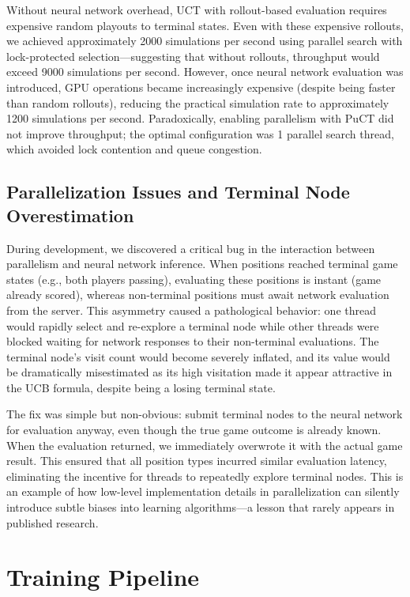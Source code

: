 \documentclass[12pt]{article}
\begin{document}
Without neural network overhead, UCT with rollout-based evaluation requires expensive random playouts to terminal states. Even with these expensive rollouts, we achieved approximately 2000 simulations per second using parallel search with lock-protected selection—suggesting that without rollouts, throughput would exceed 9000 simulations per second. However, once neural network evaluation was introduced, GPU operations became increasingly expensive (despite being faster than random rollouts), reducing the practical simulation rate to approximately 1200 simulations per second. Paradoxically, enabling parallelism with PuCT did not improve throughput; the optimal configuration was 1 parallel search thread, which avoided lock contention and queue congestion.

\subsection{Parallelization Issues and Terminal Node Overestimation}

During development, we discovered a critical bug in the interaction between parallelism and neural network inference. When positions reached terminal game states (e.g., both players passing), evaluating these positions is instant (game already scored), whereas non-terminal positions must await network evaluation from the server. This asymmetry caused a pathological behavior: one thread would rapidly select and re-explore a terminal node while other threads were blocked waiting for network responses to their non-terminal evaluations. The terminal node's visit count would become severely inflated, and its value would be dramatically misestimated as its high visitation made it appear attractive in the UCB formula, despite being a losing terminal state.

The fix was simple but non-obvious: submit terminal nodes to the neural network for evaluation anyway, even though the true game outcome is already known. When the evaluation returned, we immediately overwrote it with the actual game result. This ensured that all position types incurred similar evaluation latency, eliminating the incentive for threads to repeatedly explore terminal nodes. This is an example of how low-level implementation details in parallelization can silently introduce subtle biases into learning algorithms—a lesson that rarely appears in published research.

\section{Training Pipeline}
\end{document}

